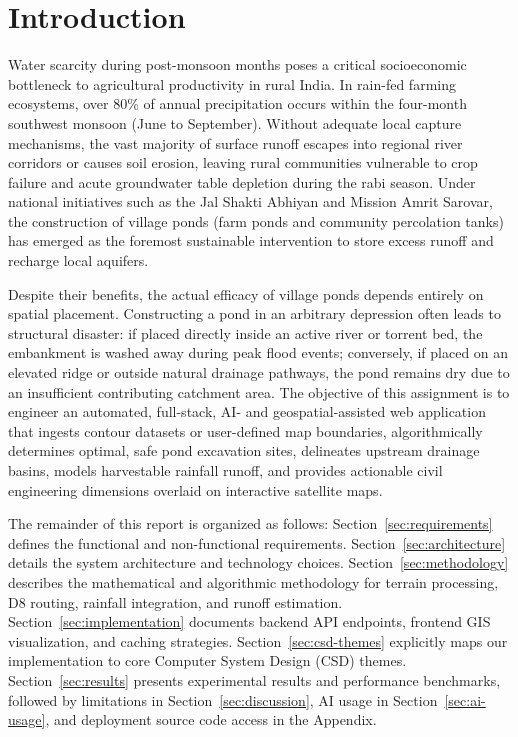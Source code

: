 \documentclass[manuscript,screen,nonacm]{acmart}
\begin{document}

\maketitle

\section{Introduction}
\label{sec:intro}
Water scarcity during post-monsoon months poses a critical socioeconomic bottleneck to agricultural productivity in rural India. In rain-fed farming ecosystems, over 80\% of annual precipitation occurs within the four-month southwest monsoon (June to September). Without adequate local capture mechanisms, the vast majority of surface runoff escapes into regional river corridors or causes soil erosion, leaving rural communities vulnerable to crop failure and acute groundwater table depletion during the rabi season. Under national initiatives such as the Jal Shakti Abhiyan and Mission Amrit Sarovar, the construction of village ponds (farm ponds and community percolation tanks) has emerged as the foremost sustainable intervention to store excess runoff and recharge local aquifers.

Despite their benefits, the actual efficacy of village ponds depends entirely on spatial placement. Constructing a pond in an arbitrary depression often leads to structural disaster: if placed directly inside an active river or torrent bed, the embankment is washed away during peak flood events; conversely, if placed on an elevated ridge or outside natural drainage pathways, the pond remains dry due to an insufficient contributing catchment area. The objective of this assignment is to engineer an automated, full-stack, AI- and geospatial-assisted web application that ingests contour datasets or user-defined map boundaries, algorithmically determines optimal, safe pond excavation sites, delineates upstream drainage basins, models harvestable rainfall runoff, and provides actionable civil engineering dimensions overlaid on interactive satellite maps.

The remainder of this report is organized as follows: Section~\ref{sec:requirements} defines the functional and non-functional requirements. Section~\ref{sec:architecture} details the system architecture and technology choices. Section~\ref{sec:methodology} describes the mathematical and algorithmic methodology for terrain processing, D8 routing, rainfall integration, and runoff estimation. Section~\ref{sec:implementation} documents backend API endpoints, frontend GIS visualization, and caching strategies. Section~\ref{sec:csd-themes} explicitly maps our implementation to core Computer System Design (CSD) themes. Section~\ref{sec:results} presents experimental results and performance benchmarks, followed by limitations in Section~\ref{sec:discussion}, AI usage in Section~\ref{sec:ai-usage}, and deployment source code access in the Appendix.
\end{document}
